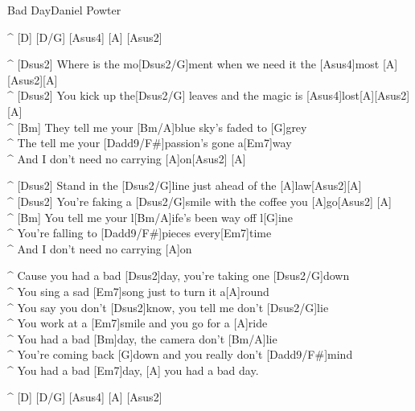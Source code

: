 \begin{song}{Bad Day}{Daniel Powter}

\begin{guitar}
^ [D] [D/G] [Asus4] [A] [Asus2]\\

\end{guitar}
\begin{guitar}
^ [Dsus2]  Where is the mo[Dsus2/G]ment when we need it the [Asus4]most [A][Asus2][A]\\
^ [Dsus2]  You kick up the[Dsus2/G] leaves and the magic is [Asus4]lost[A][Asus2][A]\\
^ [Bm]  They tell me your [Bm/A]blue sky's faded to [G]grey\\
^ The tell me your [Dadd9/F#]passion's gone a[Em7]way\\
^ And I don't need no carrying [A]on[Asus2] [A]\\
\end{guitar}

\begin{guitar}
^ [Dsus2]  Stand in the [Dsus2/G]line just ahead of the [A]law[Asus2][A]\\
^ [Dsus2]  You're faking a [Dsus2/G]smile with the coffee you [A]go[Asus2] [A]\\
^ [Bm]  You tell me your l[Bm/A]ife's been way off l[G]ine \\
^ You're falling to [Dadd9/F#]pieces every[Em7]time \\
^ And I don't need no carrying [A]on \\
\end{guitar}


\begin{guitar}
^ Cause you had a bad [Dsus2]day,  you're taking one [Dsus2/G]down \\
^ You sing a sad [Em7]song just to turn it a[A]round \\
^ You say you don't [Dsus2]know, you tell me don't [Dsus2/G]lie\\
^ You work at a [Em7]smile and you go for a [A]ride \\
^ You had a bad [Bm]day, the camera don't [Bm/A]lie\\
^ You're coming back [G]down and you really don't [Dadd9/F#]mind \\
^ You had a bad [Em7]day, [A] you had a bad day.\\
\end{guitar}

\begin{guitar}
^ [D] [D/G] [Asus4] [A] [Asus2]\\


\end{guitar}
\end{song}
